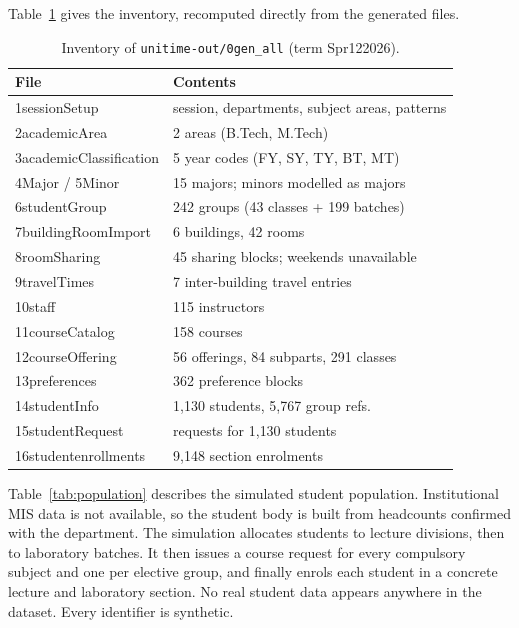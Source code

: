 \documentclass[journal]{IEEEtran}
\begin{document}
Table~\ref{tab:inventory} gives the inventory, recomputed directly from the generated files.

\begin{table}[t]
\centering
\caption{Inventory of \texttt{unitime-out/0gen\_all} (term Spr122026).}
\label{tab:inventory}
\footnotesize
\begin{tabular}{@{}ll@{}}
\toprule
File & Contents \\
\midrule
1sessionSetup & session, departments, subject areas, patterns \\
2academicArea & 2 areas (B.Tech, M.Tech) \\
3academicClassification & 5 year codes (FY, SY, TY, BT, MT) \\
4Major / 5Minor & 15 majors; minors modelled as majors \\
6studentGroup & 242 groups (43 classes + 199 batches) \\
7buildingRoomImport & 6 buildings, 42 rooms \\
8roomSharing & 45 sharing blocks; weekends unavailable \\
9travelTimes & 7 inter-building travel entries \\
10staff & 115 instructors \\
11courseCatalog & 158 courses \\
12courseOffering & 56 offerings, 84 subparts, 291 classes \\
13preferences & 362 preference blocks \\
14studentInfo & 1{,}130 students, 5{,}767 group refs. \\
15studentRequest & requests for 1{,}130 students \\
16studentenrollments & 9{,}148 section enrolments \\
\bottomrule
\end{tabular}
\end{table}

Table~\ref{tab:population} describes the simulated student population. Institutional MIS data is not available, so the student body is built from headcounts confirmed with the department. The simulation allocates students to lecture divisions, then to laboratory batches. It then issues a course request for every compulsory subject and one per elective group, and finally enrols each student in a concrete lecture and laboratory section. No real student data appears anywhere in the dataset. Every identifier is synthetic.
\end{document}
